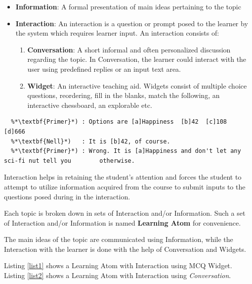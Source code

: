 \documentclass[]{article}
\begin{document}
\begin{itemize}
  \item \textbf{Information}: A formal presentation of main ideas pertaining to the topic 
  \item \textbf{Interaction}: An interaction is a question or prompt posed to the learner by the system which requires learner input. An interaction consists of:
  
  \begin{enumerate}
    \item \textbf{Conversation}: A short informal and often personalized discussion regarding the topic. In Conversation, the learner could interact with the user using predefined replies or an input text area.
    \item \textbf{Widget}: An interactive teaching aid. Widgets consist of multiple choice questions, reordering, fill in the blanks, match the following, an interactive chessboard, an explorable etc. 
  \end{enumerate}


\end{itemize}

\begin{lstlisting}[frame=single,caption=Learning Atom with Interaction using MCQ Widget with the learner Nell,label=list1]
  %*\textbf{Primer}*) : Nell, what is the answer to the ultimate question of life, the         universe, and everything?
  %*\textbf{Primer}*) : Options are [a]Happiness  [b]42  [c]108  [d]666
  %*\textbf{Nell}*)   : It is [b]42, of course.  
  %*\textbf{Primer}*) : Wrong. It is [a]Happiness and don't let any sci-fi nut tell you        otherwise.
  \end{lstlisting}


Interaction helps in retaining the student's attention and forces the student to attempt to utilize information acquired from the course to submit inputs to the questions posed during in the interaction. 

Each topic is broken down in sets of Interaction and/or Information. Such a set of Interaction and/or Information is named \textbf{Learning Atom} for convenience. 

The main ideas of the topic are communicated using Information, while the Interaction with the learner is done with the help of Conversation and Widgets.  

Listing \ref{list1} shows a Learning Atom with Interaction using MCQ Widget. Listing \ref{list2} shows a Learning Atom with Interaction using \textit{Conversation}.
\end{document}
